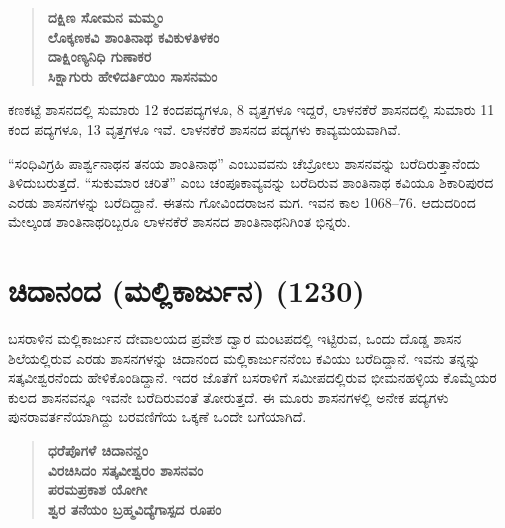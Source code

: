\begin{verse}
\textbf{ದಕ್ಷಿಣ ಸೋಮನ ಮಮ್ಮಂ} \\\textbf{ಲೊಕ್ಕಣಕವಿ ಶಾಂತಿನಾಥ ಕವಿಕುಳತಿಳಕಂ} \\\textbf{ದಾಕ್ಷಿಂಣ್ಯನಿಧಿ ಗುಣಾಕರ} \\\textbf{ಸಿಕ್ಷಾಗುರು ಹೇಳಿದರ್ತಿಯಿಂ ಸಾಸನಮಂ}
\end{verse}

ಕಣಕಟ್ಟೆ ಶಾಸನದಲ್ಲಿ ಸುಮಾರು 12 ಕಂದಪದ್ಯಗಳೂ, 8 ವೃತ್ತಗಳೂ ಇದ್ದರೆ, ಲಾಳನಕೆರೆ ಶಾಸನದಲ್ಲಿ ಸುಮಾರು 11 ಕಂದ ಪದ್ಯಗಳೂ, 13 ವೃತ್ತಗಳೂ ಇವೆ. ಲಾಳನಕೆರೆ ಶಾಸನದ ಪದ್ಯಗಳು ಕಾವ್ಯಮಯವಾಗಿವೆ.

“ಸಂಧಿವಿಗ್ರಹಿ ಪಾರ್ಶ್ವನಾಥನ ತನಯ ಶಾಂತಿನಾಥ” ಎಂಬುವವನು ಚೆಬ್ರೋಲು ಶಾಸನವನ್ನು ಬರೆದಿರುತ್ತಾನೆಂದು ತಿಳಿದುಬರುತ್ತದೆ. “ಸುಕುಮಾರ ಚರಿತೆ” ಎಂಬ ಚಂಪೂಕಾವ್ಯವನ್ನು ಬರೆದಿರುವ ಶಾಂತಿನಾಥ ಕವಿಯೂ ಶಿಕಾರಿಪುರದ ಎರಡು ಶಾಸನಗಳನ್ನು ಬರೆದಿದ್ದಾನೆ. ಈತನು ಗೋವಿಂದರಾಜನ ಮಗ. ಇವನ ಕಾಲ 1068–76. ಆದುದರಿಂದ ಮೇಲ್ಕಂಡ ಶಾಂತಿನಾಥರಿಬ್ಬರೂ ಲಾಳನಕೆರೆ ಶಾಸನದ ಶಾಂತಿನಾಥನಿಗಿಂತ ಭಿನ್ನರು.

\section*{ಚಿದಾನಂದ (ಮಲ್ಲಿಕಾರ್ಜುನ) (1230)}

ಬಸರಾಳಿನ ಮಲ್ಲಿಕಾರ್ಜುನ ದೇವಾಲಯದ ಪ್ರವೇಶ ದ್ವಾರ ಮಂಟಪದಲ್ಲಿ ಇಟ್ಟಿರುವ, ಒಂದು ದೊಡ್ಡ ಶಾಸನ ಶಿಲೆಯಲ್ಲಿರುವ ಎರಡು ಶಾಸನಗಳನ್ನು ಚಿದಾನಂದ ಮಲ್ಲಿಕಾರ್ಜುನನೆಂಬ ಕವಿಯು ಬರೆದಿದ್ದಾನೆ. ಇವನು ತನ್ನನ್ನು ಸತ್ಕವೀಶ್ವರನೆಂದು ಹೇಳಿಕೊಂಡಿದ್ದಾನೆ. ಇದರ ಜೊತೆಗೆ ಬಸರಾಳಿಗೆ ಸಮೀಪದಲ್ಲಿರುವ ಭೀಮನಹಳ್ಳಿಯ ಕೊಮ್ಮೆಯರ ಕುಲದ ಶಾಸನವನ್ನೂ ಇವನೇ ಬರೆದಿರುವಂತೆ ತೋರುತ್ತದೆ. ಈ ಮೂರು ಶಾಸನಗಳಲ್ಲಿ ಅನೇಕ ಪದ್ಯಗಳು ಪುನರಾವರ್ತನೆಯಾಗಿದ್ದು ಬರವಣಿಗೆಯ ಒಕ್ಕಣೆ ಒಂದೇ ಬಗೆಯಾಗಿದೆ.

\begin{verse}
\textbf{ಧರೆಪೊಗಳೆ ಚಿದಾನನ್ದಂ} \\\textbf{ವಿರಚಿಸಿದಂ ಸತ್ಕವೀಶ್ವರಂ ಶಾಸನವಂ} \\\textbf{ಪರಮಪ್ರಕಾಶ ಯೋಗೀ} \\\textbf{ಶ್ವರ ತನೆಯಂ ಬ್ರಹ್ಮವಿದ್ಯೆಗಾಸ್ಪದ ರೂಪಂ}
\end{verse}

